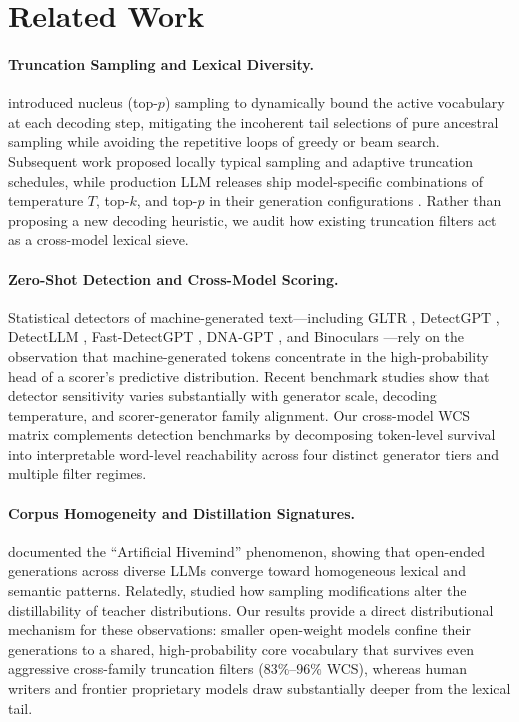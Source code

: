 \documentclass[11pt]{article}
\begin{document}
\section{Related Work}

\paragraph{Truncation Sampling and Lexical Diversity.}
\citet{holtzman2020curious} introduced nucleus (top-$p$) sampling to dynamically bound the active vocabulary at each decoding step, mitigating the incoherent tail selections of pure ancestral sampling while avoiding the repetitive loops of greedy or beam search. Subsequent work proposed locally typical sampling \citep{meister2023locally} and adaptive truncation schedules, while production LLM releases ship model-specific combinations of temperature $T$, top-$k$, and top-$p$ in their generation configurations \citep{qwen2026,gemma2026}. Rather than proposing a new decoding heuristic, we audit how existing truncation filters act as a cross-model lexical sieve.

\paragraph{Zero-Shot Detection and Cross-Model Scoring.}
Statistical detectors of machine-generated text—including GLTR \citep{gehrmann2019gltr}, DetectGPT \citep{mitchell2023detectgpt}, DetectLLM \citep{su2023detectllm}, Fast-DetectGPT \citep{bao2024fastdetectgpt}, DNA-GPT \citep{yang2024dnagpt}, and Binoculars \citep{hans2024binoculars}—rely on the observation that machine-generated tokens concentrate in the high-probability head of a scorer's predictive distribution. Recent benchmark studies \citep{dugan2024raid,koike2025membership} show that detector sensitivity varies substantially with generator scale, decoding temperature, and scorer-generator family alignment. Our cross-model WCS matrix complements detection benchmarks by decomposing token-level survival into interpretable word-level reachability across four distinct generator tiers and multiple filter regimes.

\paragraph{Corpus Homogeneity and Distillation Signatures.}
\citet{jiang2025artificial} documented the ``Artificial Hivemind'' phenomenon, showing that open-ended generations across diverse LLMs converge toward homogeneous lexical and semantic patterns. Relatedly, \citet{savani2025antidistillation} studied how sampling modifications alter the distillability of teacher distributions. Our results provide a direct distributional mechanism for these observations: smaller open-weight models confine their generations to a shared, high-probability core vocabulary that survives even aggressive cross-family truncation filters ($83\%$--$96\%$ WCS), whereas human writers and frontier proprietary models draw substantially deeper from the lexical tail.
\end{document}
